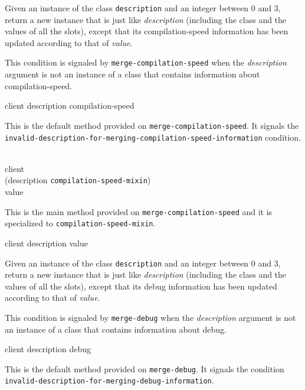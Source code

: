 Given an instance of the class \texttt{description} and an
integer between $0$ and $3$, return a new instance that is just like
\textit{description} (including the class and the values of
all the slots), except that its compilation-speed information has been
updated according to that of \textit{value}.

{\footnotesize
{}
}

This condition is signaled by \texttt{merge-compilation-speed} when the
\textit{description} argument is not an instance of a class that
contains information about compilation-speed.

{\footnotesize
{} {client description compilation-speed}
}

This is the default method provided on \texttt{merge-compilation-speed}.  It
signals the
\texttt{invalid-description-for-merging-compilation-speed-information}
condition.

{\footnotesize
{}\\
           {client\\
            (description {\tt compilation-speed-mixin})\\
            value}
}

This is the main method provided on
\texttt{merge-compilation-speed} and it is specialized to
\texttt{compilation-speed-mixin}.

{\footnotesize
{} {client description value}
}

Given an instance of the class \texttt{description} and an
integer between $0$ and $3$, return a new instance that is just like
\textit{description} (including the class and the values of
all the slots), except that its debug information has been updated
according to that of \textit{value}.

{\footnotesize
{}
}

This condition is signaled by \texttt{merge-debug} when the
\textit{description} argument is not an instance of a class that
contains information about debug.

{\footnotesize
{} {client description debug}
}

This is the default method provided on \texttt{merge-debug}.  It
signals the condition
\texttt{invalid-description-for-merging-debug-information}.

